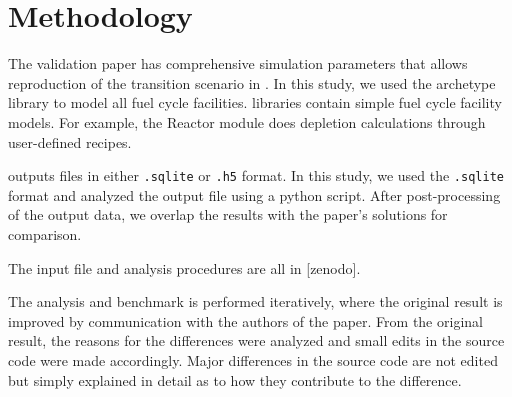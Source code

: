 \section{Methodology}

The validation paper \cite{feng_standardized_2016}
has comprehensive simulation parameters that allows
reproduction of the transition scenario in \Cyclus.
In this study, we used the \Cycamore \cite{huff_fundamental_2016}
 archetype library to model
all fuel cycle facilities. \Cycamore libraries contain
simple fuel cycle facility models. For example,
the Reactor module does depletion calculations through
user-defined recipes.

\Cyclus outputs files in either \texttt{.sqlite} or
\texttt{.h5} format. In this study, we used the
\texttt{.sqlite} format and analyzed the output file
using a python script. After post-processing of the
output data, we overlap the results with the
paper's solutions for comparison.

The input file and analysis procedures are all in
[zenodo].

The analysis and benchmark is performed iteratively,
where the original result is improved by communication
with the authors of the paper. From the original result,
the reasons for the differences were analyzed and
small edits in the source code were made accordingly.
Major differences in the source code are not edited but
simply explained in detail as to how they contribute
to the difference.
